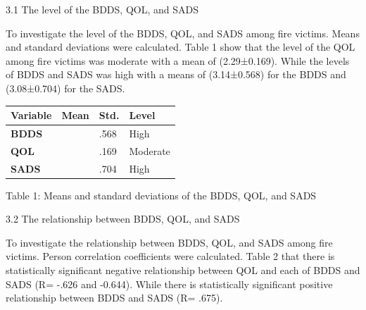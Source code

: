 \documentclass[10pt]{NSP1}
\makeatletter
\newcommand\jltx@wideopen{\par\addvspace{\medskipamount}\noindent}
\newcommand\jltx@wideclose{\par\addvspace{\medskipamount}}
\newenvironment{jltxspan}
  {\if@twocolumn\let\jltx@spannext\strip\else\let\jltx@spannext\jltx@wideopen\fi\jltx@spannext}
  {\if@twocolumn\let\jltx@spanend\endstrip\else\let\jltx@spanend\jltx@wideclose\fi\jltx@spanend}
\newcommand\JLTXaboveplacement{\par\addvspace{6pt plus 2pt minus 2pt}\noindent}
\newcommand\JLTXbelowplacement{\par\addvspace{6pt plus 2pt minus 2pt}}
\makeatother
\begin{document}
3.1 The level of the BDDS, QOL, and SADS

To investigate the level of the BDDS, QOL, and SADS among fire victims. Means and standard deviations were calculated. Table 1 show that the level of the QOL among fire victims was moderate with a mean of (2.29±0.169). While the levels of BDDS and SADS was high with a means of (3.14±0.568) for the BDDS and (3.08±0.704) for the SADS.

\JLTXaboveplacement \begin{jltxspan}%
\noindent\begin{minipage}{\linewidth}%
\centering
{\small
\begin{tabular}{|>{\centering\arraybackslash}p{}|>{\centering\arraybackslash}p{}|>{\centering\arraybackslash}p{}|>{\centering\arraybackslash}p{}|}
\hline
\cellcolor[HTML]{DDD9C3}\textbf{Variable} & \cellcolor[HTML]{DDD9C3}\textbf{Mean} & \cellcolor[HTML]{DDD9C3}\textbf{Std.} & \cellcolor[HTML]{DDD9C3}\textbf{Level} \\
\hline
\cellcolor[HTML]{DDD9C3}\textbf{BDDS} & 3.14 & .568 & High \\
\hline
\cellcolor[HTML]{DDD9C3}\textbf{QOL} & 2.29 & .169 & Moderate \\
\hline
\cellcolor[HTML]{DDD9C3}\textbf{SADS} & 3.08 & .704 & High \\
\hline
\end{tabular}}
%
\end{minipage}%
\end{jltxspan}\JLTXbelowplacement 

Table 1: Means and standard deviations of the BDDS, QOL, and SADS

3.2 The relationship between BDDS, QOL, and SADS

To investigate the relationship between BDDS, QOL, and SADS among fire victims. Person correlation coefficients were calculated. Table 2 that there is statistically significant negative relationship between QOL and each of BDDS and SADS (R= -.626 and -0.644). While there is statistically significant positive relationship between BDDS and SADS (R= .675).
\end{document}
